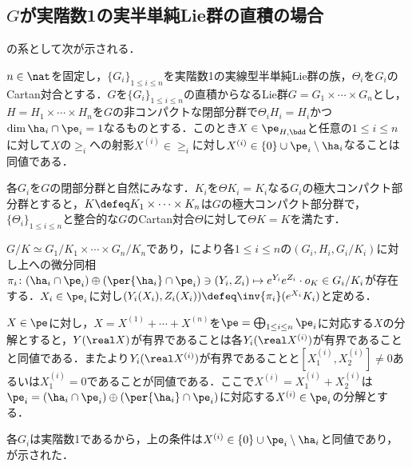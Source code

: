 \subsection{$G$が実階数1の実半単純Lie群の直積の場合}
の系として次が示される．
\begin{cor}\label{cor:0113-main}
  $n\in \nat$を固定し，$\{G_i \}_{1\leq i\leq n} $を実階数1の実線型半単純Lie群の族，$\Theta_i $を$G_i$のCartan対合とする．$G$を$\{G_i \}_{1\leq i\leq n} $の直積からなるLie群$G = G_1\times \cdots \times G_n $とし，$H = H_1\times \cdots \times H_n $を$G$の非コンパクトな閉部分群で$\Theta_i H_i = H_i$かつ$\dim \ha_i \cap\pe_i = 1$なるものとする．このとき$X\in \pe_{H,\bdd} $と任意の$1\leq i\leq n$に対して$X$の$\ge_i$への射影$X^{(i)}\in \ge_{i}$に対し$X^{(i)} \in \{0\}\cup\pe_i\setminus\ha_i $なることは同値である．
\end{cor}


  
\begin{npfwn}  
  各$G_i $を$G$の閉部分群と自然にみなす．$K_i$を$\Theta K_i = K_i $なる$G_i$の極大コンパクト部分群とすると，$K \defeq K_1\times \cdots \times K_n $は$G$の極大コンパクト部分群で，$\{\Theta_i\}_{1\leq i\leq n} $と整合的な$G$のCartan対合$\Theta$に対して$\Theta K = K $を満たす．

  $G/K\simeq G_1/K_1\times \cdots \times G_n/K_n $であり，により各$1\leq i\leq n$の$(G_i, H_i, G_i/K_i) $に対し上への微分同相$\pi_i\colon  (\ha_i\cap\pe_i)\oplus (\per{\ha_i}\cap \pe_i) \ni (Y_i, Z_i)\mapsto e^{Y_i}e^{Z_i}\cdot o_K \in G_i/K_i $が存在する．$X_i\in \pe_i $に対し$(Y_i(X_i), Z_i(X_i))\defeq \inv{\pi_i}(e^{X_i}K_i) $と定める．

  $X\in \pe$に対し，$X = X^{(1)} +\cdots + X^{(n)} $を$\pe = \bigoplus_{1\leq i\leq n}\pe_i $に対応する$X$の分解とすると，$Y(\real X) $が有界であることは各$Y_i(\real X^{(i)}) $が有界であることと同値である．またより$Y_i(\real X^{(i)}) $が有界であることと$[X_1^{(i)}, X_2^{(i)} ] \neq 0 $あるいは$X^{(i)}_1 = 0 $であることが同値である．ここで$X^{(i)} =  X_1^{(i)} + X_2^{(i)}$は$\pe_i = (\ha_i\cap\pe_i)\oplus (\per{\ha_i}\cap\pe_i) $に対応する$X^{(i)}\in \pe_i $の分解とする．

  各$G_i$は実階数1であるから，上の条件は$X^{(i)}\in \{0\}\cup\pe_i\setminus\ha_i $と同値であり，が示された．

\end{npfwn}
